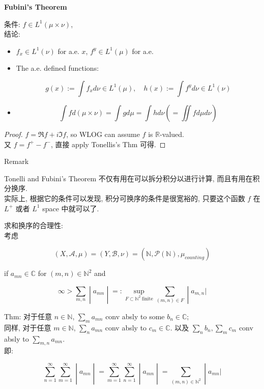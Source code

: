 \documentclass{qlnotes-export}
\begin{document}
\begin{theorem}{\protect{}\label{kn-fubini-theorem}{\textbf{Fubini's
Theorem}}}

条件: \(f \in L^{1}(\mu \times \nu)\),\\
结论:

\begin{itemize}
\item
  \(f_{x} \in L^{1}(\nu)\) for a.e. \(x\), \(f^{y} \in L^{1}(\mu)\) for a.e.
\item
  The a.e. defined functions:

  \[g(x) := \int f_{x} d\nu \in L^{1}(\mu),\quad h(x) := \int f^{y} d\nu \in L^{1}(\nu)\]
\item
  \[\int f d(\mu \times \nu) = \int g d\mu = \int h d\nu( = \iint f d\mu d\nu)\]
\end{itemize}

\end{theorem}

\begin{proof}

\(f = \Re f + i\Im f\), so WLOG can assume \(f\) is \(\mathbb{R}\)-valued.\\
又 \(f = f^{+} - f^{-}\), 直接 apply Tonellis's Thm 可得.

\end{proof}

\begin{qlremark}{Remark}

Tonelli and Fubini's Theorem 不仅有用在可以拆分积分以进行计算, 而且有用在积分换序.\\
实际上, 根据它的条件可以发现, 积分可换序的条件是很宽裕的, 只要这个函数 \(f\) 在 \(L^{+}\) 或者 \(L^{1}\) space 中就可以了.

\end{qlremark}

\begin{example}

求和换序的合理性:\\
考虑

\[(X,\mathcal{A},\mu) = (Y,\mathcal{B},\nu) = ({\mathbb{N}},\mathcal{P}({\mathbb{N}}),\mu_{counting})\]

if \(a_{mn} \in {\mathbb{C}}\) for \((m,n) \in {\mathbb{N}}^{2}\) and

\[\left. \infty > \sum\limits_{m,n} \middle| a_{mn} \middle| = :\sup\limits_{F \subset {\mathbb{N}}^{2}\ \text{finite}}\sum\limits_{(m,n) \in F} \middle| a_{m,n}| \right.\]

Thm: 对于任意 \(n \in {\mathbb{N}}\), \(\sum_{m}a_{mn}\) conv absly to some \(b_{n} \in {\mathbb{C}}\);\\
同样, 对于任意 \(m \in {\mathbb{N}}\), \(\sum_{n}a_{mn}\) conv absly to \(c_{m} \in {\mathbb{C}}\). 以及 \(\sum_{n}b_{n},\sum_{m}c_{m}\) conv absly to \(\sum_{m,n}a_{mn}\).\\
即:

\[\left. \sum\limits_{n = 1}^{\infty}\sum\limits_{m = 1}^{\infty} \middle| a_{mn} \middle| = \sum\limits_{m = 1}^{\infty}\sum\limits_{n = 1}^{\infty} \middle| a_{mn} \middle| = \sum\limits_{(m,n) \in {\mathbb{N}}^{2}} \middle| a_{mn}| \right.\]

\end{example}
\end{document}

